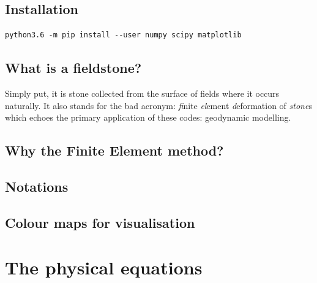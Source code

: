 \documentclass[a4paper]{article}
\begin{document}
\subsection{Installation}

\begin{verbatim}
python3.6 -m pip install --user numpy scipy matplotlib
\end{verbatim}

\subsection{What is a fieldstone?} %
Simply put, it is stone collected from the surface of fields where it 
occurs naturally. It also stands for the bad acronym: {\sl fi}nite 
{\sl el}ement {\sl d}eformation of {\sl stone}s which echoes the primary 
application of these codes: geodynamic modelling.

\subsection{Why the Finite Element method?}  %
\subsection{Notations}  %
\subsection{Colour maps for visualisation}  %


\newpage
\section{The physical equations} %

\newpage
\end{document}
